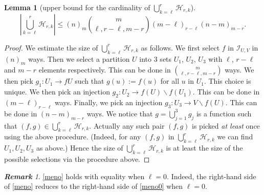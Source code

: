 \documentclass[reqno]{amsart}
\theoremstyle{theorem}
\newtheorem{lemma}[theorem]{Lemma}
\theoremstyle{definition}
\theoremstyle{remark}
\newtheorem{remark}[theorem]{\bf\em Remark}
\def\HH{\mathscr{H}}
\newcommand{\1}{{\text{\Large $\mathfrak 1$}}}	%
\numberwithin{equation}{section}
\def\II{\mathscr I}
\begin{document}
\begin{lemma}[upper bound for the cardinality of $\bigcup_{k=\ell}^r \HH_{r, k}$]
\label{cardHrl}                                                                   
\begin{equation}
\label{meno}
\left|\bigcup_{k=\ell}^r \HH_{r, k}\right|
\le (n)_m \binom{m}{\ell,r-\ell,m-r} (m-\ell)_{r-\ell} (n - m)_{m - r}.
\end{equation}
\end{lemma}
\begin{proof}
We estimate the size of $\bigcup_{k=\ell}^r \HH_{r,k}$ as follows.
We first select $f$ in $\II_{U,V}$ in $(n)_m$ ways.
Then we select a partition $U$ into 3 sets
$U_1$, $U_2$, $U_3$ with $\ell$, $r-\ell$ and $m-r$ elements respectively.
This can be done in $\binom{m}{\ell, r - \ell, m - r}$ ways.
We then pick
$g_1 : U_1 \to f U$ such that $g(u) := f(u)$ for all $u$ in $U_1$.
This choice is unique.
We then pick an injection $g_2: U_2 \to f(U) \backslash f(U_1)$.
This can be done in $(m-\ell)_{r-\ell}$ ways. 
Finally, we pick an injection $g_3 : U_3 \to V \backslash f(U)$.
This can be done in $(n-m)_{m-r}$ ways.
We notice that $g = \bigcup_{j=1}^3 g_j$ is a function such that
$(f, g) \in \bigcup_{k = \ell}^r \HH_{r, k}$.
Actually any such pair $(f, g)$ is picked {\em at least} once using the above procedure. 
(Indeed, for any $(f,g)$ in $\bigcup_{k = \ell}^r \HH_{r, k}$ we can
find $U_1, U_2, U_3$ as above.)
Hence the size of $\bigcup_{k = \ell}^r \HH_{r, k}$ is at least the
size of the possible selections via the procedure above.

\end{proof}

\begin{remark}
\eqref{meno} holds with equality when $\ell=0$.
Indeed, the right-hand side of \eqref{meno} 
reduces to the right-hand side of \eqref{meno0}  when $\ell=0$.
\end{remark}
\end{document}
